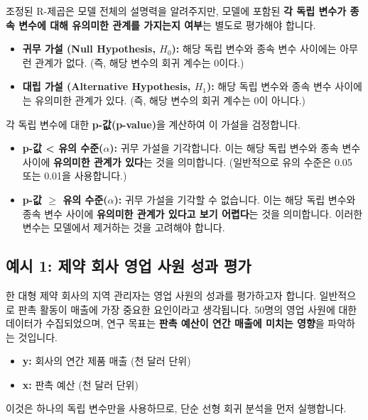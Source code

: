 \documentclass[11pt,a4paper]{book}
\theoremstyle{definition}
\begin{document}
\begin{tcolorbox}[title={\textbf{변수의 유의성 검정 (Testing the Significance)}}]
조정된 R-제곱은 모델 전체의 설명력을 알려주지만, 모델에 포함된 \textbf{각 독립 변수가 종속 변수에 대해 유의미한 관계를 가지는지 여부}는 별도로 평가해야 합니다.

\begin{itemize}
    \item \textbf{귀무 가설 (Null Hypothesis, $H_0$):} 해당 독립 변수와 종속 변수 사이에는 아무런 관계가 없다. (즉, 해당 변수의 회귀 계수는 0이다.)
    \item \textbf{대립 가설 (Alternative Hypothesis, $H_1$):} 해당 독립 변수와 종속 변수 사이에는 유의미한 관계가 있다. (즉, 해당 변수의 회귀 계수는 0이 아니다.)
\end{itemize}
각 독립 변수에 대한 \textbf{p-값(p-value)}을 계산하여 이 가설을 검정합니다.
\begin{itemize}
    \item \textbf{p-값 < 유의 수준($\alpha$):} 귀무 가설을 기각합니다. 이는 해당 독립 변수와 종속 변수 사이에 \textbf{유의미한 관계가 있다}는 것을 의미합니다. (일반적으로 유의 수준은 0.05 또는 0.01을 사용합니다.)
    \item \textbf{p-값 $\ge$ 유의 수준($\alpha$):} 귀무 가설을 기각할 수 없습니다. 이는 해당 독립 변수와 종속 변수 사이에 \textbf{유의미한 관계가 있다고 보기 어렵다}는 것을 의미합니다. 이러한 변수는 모델에서 제거하는 것을 고려해야 합니다.
\end{itemize}
\end{tcolorbox}


\subsection{예시 1: 제약 회사 영업 사원 성과 평가}

\begin{examplebox}[title=\textbf{문제 상황}]
한 대형 제약 회사의 지역 관리자는 영업 사원의 성과를 평가하고자 합니다. 일반적으로 판촉 활동이 매출에 가장 중요한 요인이라고 생각됩니다. 50명의 영업 사원에 대한 데이터가 수집되었으며, 연구 목표는 \textbf{판촉 예산이 연간 매출에 미치는 영향}을 파악하는 것입니다.

\begin{itemize}
    \item \textbf{y:} 회사의 연간 제품 매출 (천 달러 단위)
    \item \textbf{x:} 판촉 예산 (천 달러 단위)
\end{itemize}
이것은 하나의 독립 변수만을 사용하므로, 단순 선형 회귀 분석을 먼저 실행합니다.
\end{examplebox}
\end{document}
